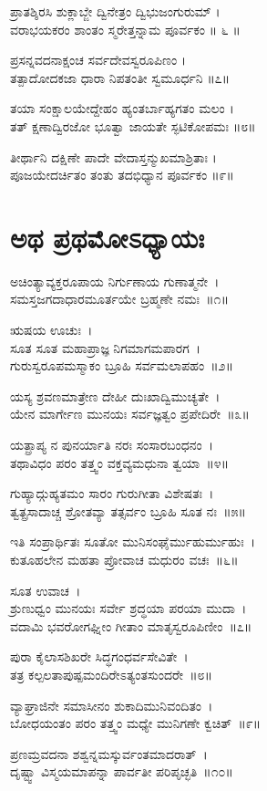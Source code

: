 ಪ್ರಾತಶ್ಶಿರಸಿ ಶುಕ್ಲಾಬ್ಜೇ ದ್ವಿನೇತ್ರಂ ದ್ವಿಭುಜಂಗುರುಮ್ ।\\
ವರಾಭಯಕರಂ ಶಾಂತಂ ಸ್ಮರೇತ್ತನ್ನಾಮ ಪೂರ್ವಕಂ ॥ ೬ ॥

ಪ್ರಸನ್ನವದನಾಕ್ಷಂಚ ಸರ್ವದೇವಸ್ವರೂಪಿಣಂ ।\\
ತತ್ಪಾದೋದಕಜಾ ಧಾರಾ ನಿಪತಂತೀ ಸ್ವಮೂರ್ಧನಿ ॥೭॥

ತಯಾ ಸಂಕ್ಷಾಲಯೇದ್ದೇಹಂ ಹ್ಯಂತರ್ಬಾಹ್ಯಗತಂ ಮಲಂ ।\\
ತತ್ ಕ್ಷಣಾದ್ವಿರಜೋ ಭೂತ್ವಾ ಜಾಯತೇ ಸ್ಫಟಿಕೋಪಮಃ ॥೮॥

ತೀರ್ಥಾನಿ ದಕ್ಷಿಣೇ ಪಾದೇ ವೇದಾಸ್ತನ್ಮುಖಮಾಶ್ರಿತಾಃ ।\\
ಪೂಜಯೇದರ್ಚಿತಂ ತಂತು ತದಭಿಧ್ಯಾನ ಪೂರ್ವಕಂ ॥೯॥

\section{ಅಥ ಪ್ರಥಮೋಽಧ್ಯಾಯಃ}
ಅಚಿಂತ್ಯಾವ್ಯಕ್ತರೂಪಾಯ ನಿರ್ಗುಣಾಯ ಗುಣಾತ್ಮನೇ~।\\
ಸಮಸ್ತಜಗದಾಧಾರಮೂರ್ತಯೇ ಬ್ರಹ್ಮಣೇ ನಮಃ~॥೧॥

ಋಷಯ ಊಚುಃ~।\\
ಸೂತ ಸೂತ ಮಹಾಪ್ರಾಜ್ಞ ನಿಗಮಾಗಮಪಾರಗ~।\\
ಗುರುಸ್ವರೂಪಮಸ್ಮಾಕಂ ಬ್ರೂಹಿ ಸರ್ವಮಲಾಪಹಂ~॥೨॥

ಯಸ್ಯ ಶ್ರವಣಮಾತ್ರೇಣ ದೇಹೀ ದುಃಖಾದ್ವಿಮುಚ್ಯತೇ~।\\
ಯೇನ ಮಾರ್ಗೇಣ ಮುನಯಃ ಸರ್ವಜ್ಞತ್ವಂ ಪ್ರಪೇದಿರೇ~॥೩॥

ಯತ್ಪ್ರಾಪ್ಯ ನ ಪುನರ್ಯಾತಿ ನರಃ ಸಂಸಾರಬಂಧನಂ~।\\
ತಥಾವಿಧಂ ಪರಂ ತತ್ತ್ವಂ ವಕ್ತವ್ಯಮಧುನಾ ತ್ವಯಾ~॥೪॥

ಗುಹ್ಯಾದ್ಗುಹ್ಯತಮಂ ಸಾರಂ ಗುರುಗೀತಾ ವಿಶೇಷತಃ~।\\
ತ್ವತ್ಪ್ರಸಾದಾಚ್ಚ ಶ್ರೋತವ್ಯಾ ತತ್ಸರ್ವಂ ಬ್ರೂಹಿ ಸೂತ ನಃ~॥೫॥

ಇತಿ ಸಂಪ್ರಾರ್ಥಿತಃ ಸೂತೋ ಮುನಿಸಂಘೈರ್ಮುಹುರ್ಮುಹುಃ~।\\
ಕುತೂಹಲೇನ ಮಹತಾ ಪ್ರೋವಾಚ ಮಧುರಂ ವಚಃ~॥೬॥

ಸೂತ ಉವಾಚ~।\\
ಶ್ರುಣುಧ್ವಂ ಮುನಯಃ ಸರ್ವೇ ಶ್ರದ್ಧಯಾ ಪರಯಾ ಮುದಾ~।\\
ವದಾಮಿ ಭವರೋಗಘ್ನೀಂ ಗೀತಾಂ ಮಾತೃಸ್ವರೂಪಿಣೀಂ~॥೭॥

ಪುರಾ ಕೈಲಾಸಶಿಖರೇ ಸಿದ್ಧಗಂಧರ್ವಸೇವಿತೇ~।\\
ತತ್ರ ಕಲ್ಪಲತಾಪುಷ್ಪಮಂದಿರೇಽತ್ಯಂತಸುಂದರೇ~॥೮॥

ವ್ಯಾಘ್ರಾಜಿನೇ ಸಮಾಸೀನಂ ಶುಕಾದಿಮುನಿವಂದಿತಂ~।\\
ಬೋಧಯಂತಂ ಪರಂ ತತ್ತ್ವಂ ಮಧ್ಯೇ ಮುನಿಗಣೇ ಕ್ವಚಿತ್~॥೯॥

ಪ್ರಣಮ್ರವದನಾ ಶಶ್ವನ್ನಮಸ್ಕುರ್ವಂತಮಾದರಾತ್~।\\
ದೃಷ್ಟ್ವಾ ವಿಸ್ಮಯಮಾಪನ್ನಾ ಪಾರ್ವತೀ ಪರಿಪೃಚ್ಛತಿ~॥೧೦॥

